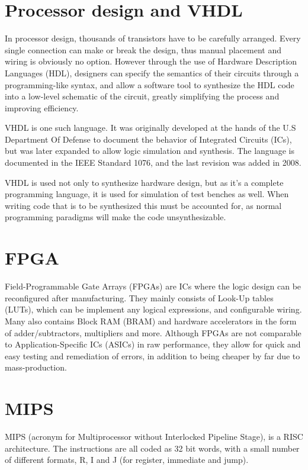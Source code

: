 \section{Processor design and VHDL}
In processor design, thousands of transistors have to be carefully arranged.
Every single connection can make or break the design, thus manual placement and
wiring is obviously no option.  However through the use of Hardware Description
Languages (HDL), designers can specify the semantics of their circuits through a
programming-like syntax, and allow a software tool to synthesize the HDL code
into a low-level schematic of the circuit, greatly simplifying the process and
improving efficiency.


VHDL is one such language.  It was originally developed at the hands of the U.S
Department Of Defense to document the behavior of Integrated Circuits (ICs), but
was later expanded to allow logic simulation and synthesis. The language is
documented in the IEEE Standard 1076, and the last revision was added in
2008.\cite{ieee-1076}

VHDL is used not only to synthesize hardware design, but as it's a complete
programming language, it is used for simulation of test benches as well. When
writing code that is to be synthesized this must be accounted for, as normal
programming paradigms will make the code unsynthesizable.


\section{FPGA}
Field-Programmable Gate Arrays (FPGAs) are ICs where the logic design can be
reconfigured after manufacturing.  They mainly consists of Look-Up tables
(LUTs), which can be implement any logical expressions, and configurable wiring.
Many also contains Block RAM (BRAM) and hardware accelerators in the form of
adder/subtractors, multipliers and more.  Although FPGAs are not comparable to
Application-Specific ICs (ASICs) in raw performance, they allow for quick and
easy testing and remediation of errors, in addition to being cheaper by far due
to mass-production.


\section{MIPS}
MIPS (acronym for Multiprocessor without Interlocked Pipeline Stage), is a RISC
architecture. The instructions are all coded as 32 bit words, with a small
number of different formats, R, I and J (for register, immediate and jump). 

